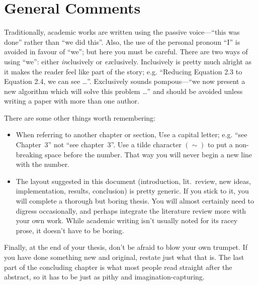 \section{General Comments}
Traditionally, academic works are written using the passive
voice---``this was done'' rather than ``we did this''.  Also, the use
of the personal pronoun ``I'' is avoided in favour of ``we''; but here
you must be careful.  There are two ways of using ``we'': either {\em
in}clusively or {\em ex}clusively.  Inclusively is pretty much alright
as it makes the reader feel like part of the story; e.g. ``Reducing
Equation 2.3 to Equation 2.4, we can see \ldots''.  Exclusively sounds
pompous---``we now present a new algorithm which will solve this
problem \ldots'' and should be avoided unless writing a paper with
more than one author.

There are some other things worth remembering:
\begin{itemize}
\item When referring to another chapter or section, Use a capital
letter; e.g. ``see Chapter~3'' not ``see chapter~3''.  Use a tilde
character $(\sim)$ to put a non-breaking space before the number.  That
way you will never begin a new line with the number.
\item The layout suggested in this document (introduction, lit.\
review, new ideas, implementation, results, conclusion) is pretty
generic.  If you stick to it, you will complete a thorough but boring
thesis.  You will almost certainly need to digress occasionally, and
perhaps integrate the literature review more with your own work.
While academic writing isn't usually noted for its racey prose, it
doesn't have to be boring.
\end{itemize}

Finally, at the end of your thesis, don't be afraid to blow your own
trumpet.  If you have done something new and original, restate just
what that is.  The last part of the concluding chapter is what most
people read straight after the abstract, so it has to be just as pithy
and imagination-capturing.

